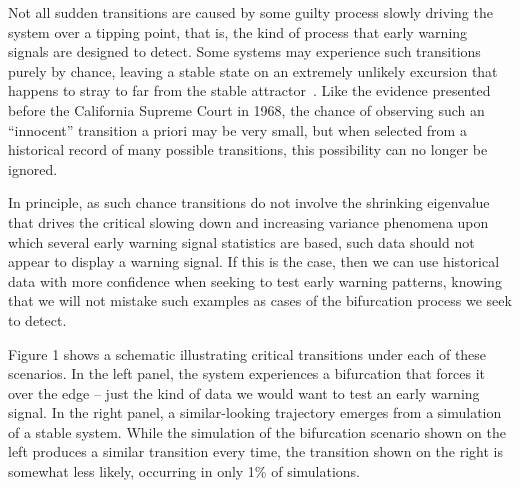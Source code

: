 \documentclass[authoryear,review,12pt]{elsarticle}
\begin{document}
Not all sudden transitions are caused by some guilty process slowly
driving the system over a tipping point, that is, the kind of process
that early warning signals are designed to detect.  Some systems may
experience such transitions purely by chance, leaving a stable state on
an extremely unlikely excursion that happens to stray to far from the
stable attractor~\citep[\emph{e.g.} ][consider this possibility in 
transitions that arise from analyzing historical climate record]{Ditlevsen2010, Lenton2011}. 
Like the evidence presented before the California Supreme
Court in 1968, the chance of observing such an ``innocent'' transition 
a priori may be very small, but when selected from a historical record
of many possible transitions, this possibility can no longer be ignored.

In principle, as such chance transitions do not involve the shrinking
eigenvalue that drives the critical slowing down and increasing variance
phenomena upon which several early warning signal statistics are based,
such data should not appear to display a warning signal. If this is the case,
then we can use historical data with more confidence when seeking to 
test early warning patterns, knowing that we will not mistake such examples
as cases of the bifurcation process we seek to detect.  

Figure 1 shows a schematic illustrating critical transitions under
each of these scenarios.  In the left panel, the system experiences 
a bifurcation that forces it over the edge -- just the kind of data 
we would want to test an early warning signal.  In the right panel,
a similar-looking trajectory emerges from a simulation of a stable 
system.  While the simulation of the bifurcation scenario shown on
the left produces a similar transition every time, the transition 
shown on the right is somewhat less likely, occurring in only 1\% of
simulations.  
\end{document}
